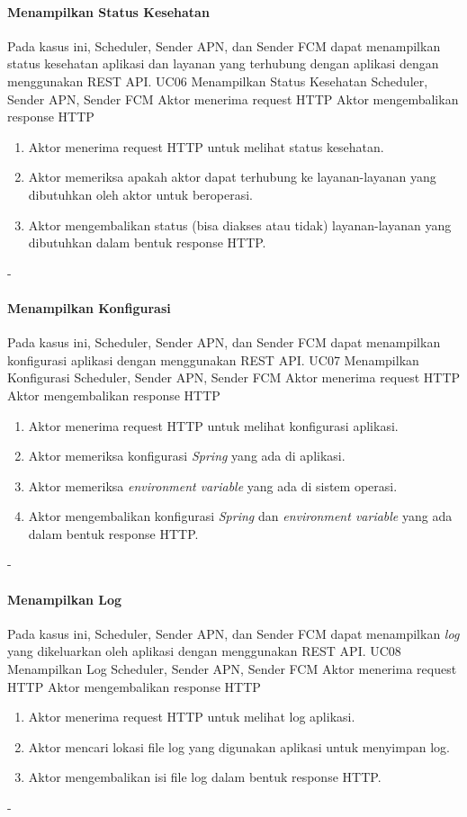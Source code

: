 \paragraph{Menampilkan Status Kesehatan}
\par Pada kasus ini, Scheduler, Sender APN, dan Sender FCM dapat menampilkan status kesehatan aplikasi dan layanan yang terhubung dengan aplikasi dengan menggunakan REST API.
\tableUcDesc
{UC06}
{Menampilkan Status Kesehatan}
{Scheduler, Sender APN, Sender FCM}
{Aktor menerima request HTTP}
{Aktor mengembalikan response HTTP}
{
	\begin{enumerate}
		\item Aktor menerima request HTTP untuk melihat status kesehatan.
		\item Aktor memeriksa apakah aktor dapat terhubung ke layanan-layanan yang dibutuhkan oleh aktor untuk beroperasi.
		\item Aktor mengembalikan status (bisa diakses atau tidak) layanan-layanan yang dibutuhkan dalam bentuk response HTTP.
	\end{enumerate}
}
{-}

\paragraph{Menampilkan Konfigurasi}
\par Pada kasus ini, Scheduler, Sender APN, dan Sender FCM dapat menampilkan konfigurasi aplikasi dengan menggunakan REST API.
\tableUcDesc
{UC07}
{Menampilkan Konfigurasi}
{Scheduler, Sender APN, Sender FCM}
{Aktor menerima request HTTP}
{Aktor mengembalikan response HTTP}
{
	\begin{enumerate}
		\item Aktor menerima request HTTP untuk melihat konfigurasi aplikasi.
		\item Aktor memeriksa konfigurasi \textit{Spring} yang ada di aplikasi.
		\item Aktor memeriksa \textit{environment variable} yang ada di sistem operasi.
		\item Aktor mengembalikan konfigurasi \textit{Spring} dan \textit{environment variable} yang ada dalam bentuk response HTTP.
	\end{enumerate}
}
{-}

\paragraph{Menampilkan Log}
\par Pada kasus ini, Scheduler, Sender APN, dan Sender FCM dapat menampilkan \textit{log} yang dikeluarkan oleh aplikasi dengan menggunakan REST API.
\tableUcDesc
{UC08}
{Menampilkan Log}
{Scheduler, Sender APN, Sender FCM}
{Aktor menerima request HTTP}
{Aktor mengembalikan response HTTP}
{
\begin{enumerate}
	\item Aktor menerima request HTTP untuk melihat log aplikasi.
	\item Aktor mencari lokasi file log yang digunakan aplikasi untuk menyimpan log.
	\item Aktor mengembalikan isi file log dalam bentuk response HTTP.
\end{enumerate}
}
{-}

